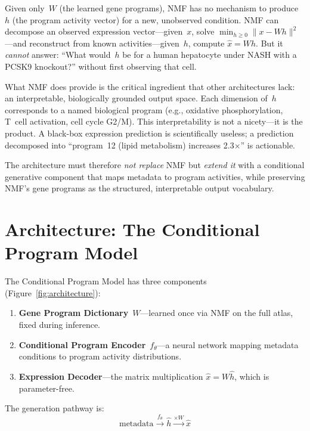 \documentclass[10pt,twocolumn,letterpaper]{article}
\begin{document}
Given only~$W$ (the learned gene programs), NMF has no mechanism to produce~$h$
(the program activity vector) for a new, unobserved condition. NMF can decompose
an observed expression vector---given~$x$, solve
$\min_{h \geq 0} \|x - Wh\|^2$---and reconstruct from known activities---given~$h$,
compute $\hat{x} = Wh$. But it \emph{cannot} answer: ``What would~$h$ be for a
human hepatocyte under NASH with a PCSK9 knockout?'' without first observing that
cell.

What NMF does provide is the critical ingredient that other architectures lack:
an interpretable, biologically grounded output space. Each dimension of~$h$
corresponds to a named biological program (e.g., oxidative phosphorylation, T~cell
activation, cell cycle G2/M). This interpretability is not a nicety---it is the
product. A black-box expression prediction is scientifically useless; a
prediction decomposed into ``program~12 (lipid metabolism) increases 2.3$\times$''
is actionable.

The architecture must therefore \emph{not replace} NMF but \emph{extend it} with
a conditional generative component that maps metadata to program activities,
while preserving NMF's gene programs as the structured, interpretable output
vocabulary.

\section{Architecture: The Conditional Program Model}
\label{sec:cpm}

The Conditional Program Model has three components (Figure~\ref{fig:architecture}):
\begin{enumerate}
  \item \textbf{Gene Program Dictionary}~$W$---learned once via NMF on the full
    atlas, fixed during inference.
  \item \textbf{Conditional Program Encoder}~$f_\theta$---a neural network
    mapping metadata conditions to program activity distributions.
  \item \textbf{Expression Decoder}---the matrix multiplication
    $\hat{x} = W\hat{h}$, which is parameter-free.
\end{enumerate}

The generation pathway is:
\begin{equation}
  \text{metadata} \xrightarrow{f_\theta} \hat{h} \xrightarrow{\times W} \hat{x}
  \label{eq:pathway}
\end{equation}
\end{document}
